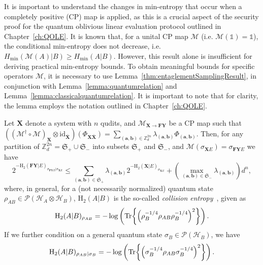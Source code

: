 It is important to understand the changes in min-entropy that occur when a completely positive (CP) map is applied, as this is a crucial aspect of the security proof for the quantum oblivious linear evaluation protocol outlined in Chapter~\ref{ch:QOLE}. It is known that, for a unital CP map $\mathcal{M}$ (i.e. $\mathcal{M}(\mathds{1}) = \mathds{1}$), the conditional min-entropy does not decrease, i.e. $H_{\min}(\mathcal{M}(A)| B) \geq H_{\min}(A| B)$. However, this result alone is insufficient for deriving practical min-entropy bounds. To obtain meaningful bounds for specific operators $\mathcal{M}$, it is necessary to use Lemma~\ref{thm:entaglementSamplingResult}, in conjunction with Lemma~\ref{lemma:quantumrelation} and Lemma~\ref{lemma:classicalquantumrelation}. It is important to note that for clarity, the lemma employs the notation outlined in Chapter~\ref{ch:QOLE}.


\begin{lemma} 
\label{thm:entaglementSamplingResult}
Let $\mathbf{X}$ denote a system with $n$ qudits, and  $\mathcal{M}_{\mathbf{X}\rightarrow \mathbf{F}\mathbf{Y}}$ be a CP map such that $((\mathcal{M}^\dagger \circ \mathcal{M})_{\mathbf{X}}\otimes \text{id}_{\bar{\mathbf{X}}})(\Phi_{\mathbf{X}\bar{\mathbf{X}}}) = \sum_{(\bm{a},\bm{b})\in\mathbb{Z}^{2n}_d} \lambda_{(\bm{a},\bm{b})} \Phi_{(\bm{a},\bm{b})}$. Then, for any partition of $\mathbb{Z}^{2n}_d = \mathfrak{S}_+ \cup \mathfrak{S}_-$ into subsets $\mathfrak{S}_+$ and $\mathfrak{S}_-$, and $\mathcal{M}(\sigma_{\mathbf{X}E}) = \sigma_{\mathbf{F}\mathbf{Y}E}$ we have 
\begin{equation}
    2^{-\text{H}_2(\mathbf{F}\mathbf{Y} | E)_{\sigma_{\mathbf{F}\mathbf{Y}E} | \sigma_{\mathbf{X}E}}} \leq \sum_{(\bm{a},\bm{b})\in\mathfrak{S}_+} \lambda_{(\bm{a},\bm{b})} 2^{-\text{H}_2(\mathbf{X} | E)_{\sigma_{\mathbf{X}E}}} + \left(\max_{(\bm{a},\bm{b})\in\mathfrak{S}_-} \lambda_{(\bm{a},\bm{b})}\right) d^n,
\end{equation}
 where, in general, for a (not necessarily normalized) quantum state $\rho_{AB}\in \mathcal{P}(\mathcal{H}_A\otimes\mathcal{H}_B)$, $\text{H}_2(A|B)$   is the so-called \textit{collision entropy}~\cite{R06}, given as 
\begin{equation*} 
    \text{H}_2(A|B)_{\rho_{AB}}=-\log \left(\Tr{\left(\rho_{B}^{-1/4}\rho_{AB}\rho_B^{-1/4}\right)^2}\right).
\end{equation*}
If we further condition on a general quantum state $\sigma_B\in\mathcal{P}(\mathcal{H}_B)$, we have 
\begin{equation*}
    \text{H}_2(A|B)_{\rho_{AB}|\sigma_B}=-\log \left(\Tr{\left(\sigma_{B}^{-1/4}\rho_{AB}\sigma_B^{-1/4}\right)^2}\right).
\end{equation*}
\end{lemma}

